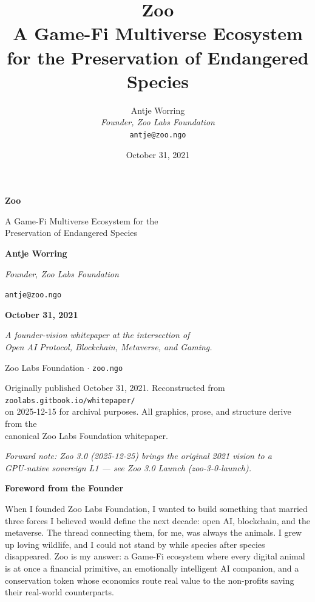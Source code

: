 \documentclass[11pt,letterpaper]{article}
\title{\textbf{Zoo}\\\large A Game-Fi Multiverse Ecosystem for the Preservation of Endangered Species}
\author{Antje Worring\\\textit{Founder, Zoo Labs Foundation}\\\texttt{antje@zoo.ngo}}
\date{October 31, 2021}
\begin{document}
\begin{titlepage}
  \thispagestyle{empty}
  \centering
  \vspace*{2cm}
  {\Huge\bfseries Zoo\par}
  \vspace{0.6cm}
  {\Large A Game-Fi Multiverse Ecosystem for the\\Preservation of Endangered Species\par}
  \vspace{2cm}
  {\large \textbf{Antje Worring}\par}
  \vspace{0.2cm}
  {\itshape Founder, Zoo Labs Foundation\par}
  \vspace{0.1cm}
  {\small \texttt{antje@zoo.ngo}\par}
  \vspace{2cm}
  {\large \textbf{October 31, 2021}\par}
  \vfill
  {\itshape A founder-vision whitepaper at the intersection of\\Open AI Protocol, Blockchain, Metaverse, and Gaming.\par}
  \vspace{1cm}
  {\small Zoo Labs Foundation \quad $\cdot$ \quad \texttt{zoo.ngo}\par}
  \vspace{0.4cm}
  {\scriptsize Originally published October 31, 2021. Reconstructed from \texttt{zoolabs.gitbook.io/whitepaper/}\\on 2025-12-15 for archival purposes. All graphics, prose, and structure derive from the\\canonical Zoo Labs Foundation whitepaper.\par}
  \vspace{0.3cm}
  {\scriptsize\itshape Forward note: Zoo 3.0 (2025-12-25) brings the original 2021 vision to a\\GPU-native sovereign L1 --- see \emph{Zoo 3.0 Launch} (zoo-3-0-launch).\par}
\end{titlepage}

\setcounter{page}{1}

\begin{center}
{\Large \textbf{Foreword from the Founder}}
\end{center}
\medskip

\noindent When I founded Zoo Labs Foundation, I wanted to build something that married three forces I believed would define the next decade: open AI, blockchain, and the metaverse. The thread connecting them, for me, was always the animals. I grew up loving wildlife, and I could not stand by while species after species disappeared. Zoo is my answer: a Game-Fi ecosystem where every digital animal is at once a financial primitive, an emotionally intelligent AI companion, and a conservation token whose economics route real value to the non-profits saving their real-world counterparts.
\end{document}
